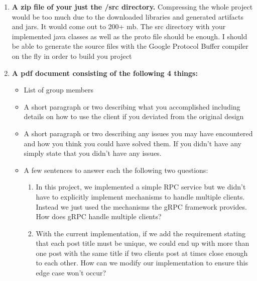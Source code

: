 \documentclass{article}
\begin{document}
\begin{enumerate}
\item \textbf{A zip file of your just the /src directory.} Compressing the whole project would be too much due to the downloaded libraries and generated artifacts and jars. It would come out to 200+ mb. The src directory with your implemented java classes as well as the proto file should be enough. I should be able to generate the source files with the Google Protocol Buffer compiler on the fly in order to build you project
\item \textbf{A pdf document consisting of the following 4 things:}
	\begin{itemize}
	\item List of group members
	\item A short paragraph or two describing what you accomplished including details on how to use the client if you deviated from the original design
	\item A short paragraph or two describing any issues you may have encountered and how you think you could have solved them. If you didn't have any simply state that you didn't have any issues.
	\item A few sentences to answer each the following two questions:
	\begin{enumerate}
		\item In this project, we implemented a simple RPC service but we didn't have to explicitly implement mechanisms to handle multiple clients. Instead we just used the mechanisms the gRPC framework provides. How does gRPC handle multiple clients?
		\item With the current implementation, if we add the requirement stating that each post title must be unique, we could end up with more than one post with the same title if two clients post at times close enough to each other. How can we modify our implementation to ensure this edge case won't occur?
	\end{enumerate}
	\end{itemize}
\end{enumerate}


\end{document}
